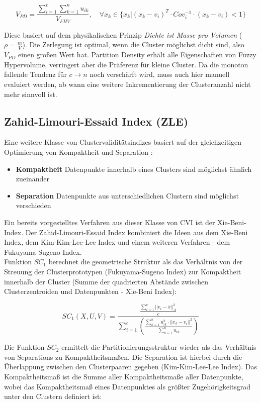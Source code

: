 \documentclass[11pt,ceqn]{book}
\begin{document}
$$V_{PD}=\frac{\sum\limits_{i=1}^c \sum\limits_{k=1}^n u_{ik}}{V_{FHV}},\quad \forall x_k \in \{x_k|(x_k-v_i)^T\cdot Cov_i^{-1}\cdot(x_k-v_i)<1\}$$

Diese basiert auf dem physikalischen Prinzip \textit{Dichte ist Masse pro Volumen} ($\rho = \frac{m}{V}$). Die Zerlegung ist optimal, wenn die Cluster möglichst dicht sind, also $V_{PD}$ einen großen Wert hat. Partition Density erhält alle Eigenschaften von Fuzzy Hypervolume, verringert aber die Präferenz für kleine Cluster. Da die monoton fallende Tendenz für $c \rightarrow n$ noch verschärft wird, muss auch hier manuell evaluiert werden, ab wann eine weitere Inkrementierung der Clusteranzahl nicht mehr sinnvoll ist.


\subsection{Zahid-Limouri-Essaid Index (ZLE)}
Eine weitere Klasse von Clustervaliditätsindizes basiert auf der gleichzeitigen Optimierung von Kompaktheit und Separation \cite{zle}:
\begin{itemize}
\item \textbf{Kompaktheit} Datenpunkte innerhalb eines Clusters sind möglichst ähnlich zueinander
\item \textbf{Separation} Datenpunkte aus unterschiedlichen Clustern sind möglichst verschieden
\end{itemize}

Ein bereits vorgestelltes Verfahren aus dieser Klasse von CVI ist der Xie-Beni-Index. Der Zahid-Limouri-Essaid Index kombiniert die Ideen aus dem Xie-Beni Index, dem Kim-Kim-Lee-Lee Index und einem weiteren Verfahren - dem Fukuyama-Sugeno Index. \\

Funktion $SC_1$ berechnet die geometrische Struktur als das Verhältnis von der Streuung der Clusterprototypen (Fukuyama-Sugeno Index) zur Kompaktheit innerhalb der Cluster (Summe der quadrierten Abstände zwischen Clusterzentroiden und Datenpunkten - Xie-Beni Index):

$$SC_1(X,U,V) = \frac{\frac{\sum\limits_{i=1}^c ||v_i-\overline{x}||_A^2}{c}}{\sum\limits_{i=1}^c\left(\frac{\sum\limits_{k=1}^n u_{ik}^2 \cdot ||x_k-v_i||^2}{\sum\limits_{k=1}^n u_{ik}}\right)}$$

Die Funktion $SC_2$ ermittelt die Partitionierungsstruktur wieder als das Verhältnis von Separations zu Kompaktheitsmaßen. Die Separation ist hierbei durch die Überlappung zwischen den Clusterpaaren gegeben (Kim-Kim-Lee-Lee Index). Das Kompaktheitsmaß ist die Summe aller Kompaktheitsmaße aller Datenpunkte, wobei das Kompaktheitsmaß eines Datenpunktes als größter Zugehörigkeitsgrad unter den Clustern definiert ist: 
\end{document}
